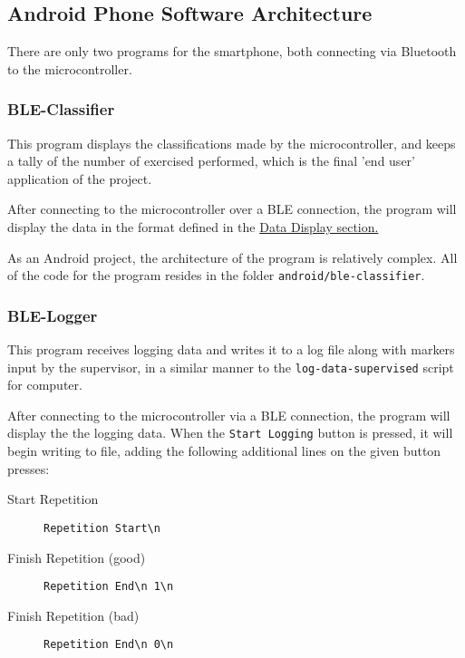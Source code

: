 \documentclass[a4paper]{article}
\begin{document}
\subsection{Android Phone Software Architecture}%
\label{subsec:dc_asa}

There are only two programs for the smartphone, both connecting via Bluetooth to the microcontroller.

\subsubsection{BLE-Classifier}
\label{subsubsec:dc_asa_classifier}

This program displays the classifications made by the microcontroller, and keeps a tally of the number of exercised performed, which is the final 'end user' application of the project.

After connecting to the microcontroller over a BLE connection, the program will display the data in the format defined in the \hyperref[subsec:dc_datadisplay]{Data Display section.}

As an Android project, the architecture of the program is relatively complex. All of the code for the program resides in the folder \lstinline{android/ble-classifier}. 


\subsubsection{BLE-Logger}
\label{subsubsec:dc_asa_logger}

This program receives logging data and writes it to a log file along with markers input by the supervisor, in a similar manner to the \lstinline{log-data-supervised} script for computer.

After connecting to the microcontroller via a BLE connection, the program will display the the logging data. When the \lstinline{Start Logging} button is pressed, it will begin writing to file, adding the following additional lines on the given button presses:

\begin{description}
\item[Start Repetition] \lstinline|Repetition Start\n|
\item[Finish Repetition (good)] \lstinline|Repetition End\n 1\n|
\item[Finish Repetition (bad)] \lstinline|Repetition End\n 0\n|
\end{description}
\end{document}
